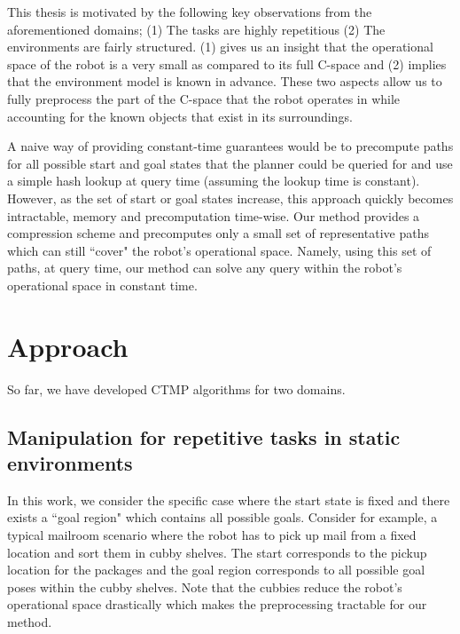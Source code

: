 \documentclass[a4paper]{report}
\begin{document}
This thesis is motivated by the following key observations from the aforementioned domains; (1) The tasks are highly repetitious (2) The  environments are fairly structured. (1) gives us an insight that the operational space of the robot is a very small as compared to its full C-space and (2) implies that the environment model is known in advance. These two aspects allow us to fully preprocess the part of the C-space that the robot operates in while accounting for the known objects that exist in its surroundings.

A naive way of providing constant-time guarantees would be to precompute paths for all possible start and goal states that the planner could be queried for and use a simple hash lookup at query time (assuming the lookup time is constant). However, as the set of start or goal states increase, this approach quickly becomes intractable, memory and precomputation time-wise. Our method provides a compression scheme and precomputes only a small set of representative paths which can still ``cover" the robot's operational space. Namely, using this set of paths, at query time, our method can solve any query within the robot's operational space in constant time.

\section{Approach}
\label{sec:approach}
So far, we have developed CTMP algorithms for two domains.
\subsection{Manipulation for repetitive tasks in static environments}
In this work, we consider the specific case where the start state is fixed and there exists a ``goal region" which contains all possible goals. Consider for example, a typical mailroom scenario where the robot has to pick up mail from a fixed location and sort them in cubby shelves. The start corresponds to the pickup location for the packages and the goal region corresponds to all possible goal poses within the cubby shelves. Note that the cubbies reduce the robot's operational space drastically which makes the preprocessing tractable for our method.
\end{document}
